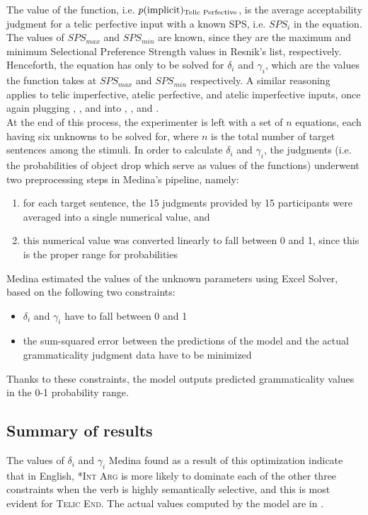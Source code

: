 The value of the function, i.e. $p(\text{implicit})\textsubscript{Telic Perfective}$, is the average acceptability judgment for a telic perfective input with a known SPS, i.e. $SPS_{i}$ in the equation. The values of $SPS_{max}$ and $SPS_{min}$ are known, since they are the maximum and minimum Selectional Preference Strength values in Resnik's list, respectively. Henceforth, the equation has only to be solved for $\delta_i$ and $\gamma_i$, which are the values the function takes at $SPS_{max}$ and $SPS_{min}$ respectively. A similar reasoning applies to telic imperfective, atelic perfective, and atelic imperfective inputs, once again plugging , , and  into , , and .\\
At the end of this process, the experimenter is left with a set of $n$ equations, each having six unknowns to be solved for, where $n$ is the total number of target sentences among the stimuli. In order to calculate $\delta_i$ and $\gamma_i$, the judgments (i.e. the probabilities of object drop which serve as values of the functions) underwent two preprocessing steps in Medina's pipeline, namely:
\begin{enumerate}
    \item for each target sentence, the 15 judgments provided by 15 participants were averaged into a single numerical value, and
    \item this numerical value was converted linearly to fall between 0 and 1, since this is the proper range for probabilities
\end{enumerate}

Medina estimated the values of the unknown parameters using Excel Solver, based on the following two constraints: 
\begin{itemize}
    \item $\delta_i$ and $\gamma_i$ have to fall between 0 and 1
    \item the sum-squared error between the predictions of the model and the actual grammaticality judgment data have to be minimized
\end{itemize}
Thanks to these constraints, the model outputs predicted grammaticality values in the 0-1 probability range.

\subsection{Summary of results} The values of $\delta_i$ and $\gamma_i$ Medina found as a result of this optimization indicate that in English, \textsc{*Int Arg} is more likely to dominate each of the other three constraints when the verb is highly semantically selective, and this is most evident for \textsc{Telic End}. The actual values computed by the model are in .


